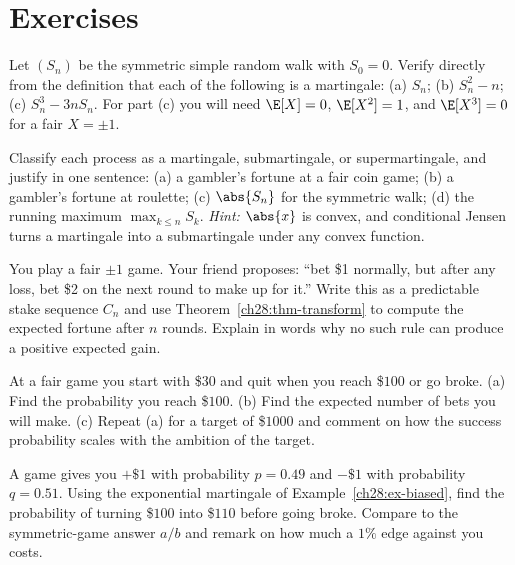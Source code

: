 \section{Exercises}
\label{ch28:exercises}

\begin{exercise}
\label{ch28:exer-warmup}
Let $(S_n)$ be the symmetric simple random walk with $S_0 = 0$. Verify directly from the definition
that each of the following is a martingale: (a) $S_n$; (b) $S_n^2 - n$; (c) $S_n^3 - 3n S_n$. For part
(c) you will need $\E[X] = 0$, $\E[X^2] = 1$, and $\E[X^3] = 0$ for a fair $X = \pm 1$.
\end{exercise}

\begin{exercise}
\label{ch28:exer-def}
Classify each process as a martingale, submartingale, or supermartingale, and justify in one sentence:
(a) a gambler's fortune at a fair coin game; (b) a gambler's fortune at roulette; (c) $\abs{S_n}$ for
the symmetric walk; (d) the running maximum $\max_{k\le n} S_k$. \emph{Hint:} $\abs{x}$ is convex, and
conditional Jensen turns a martingale into a submartingale under any convex function.
\end{exercise}

\begin{exercise}
\label{ch28:exer-predictable}
You play a fair $\pm 1$ game. Your friend proposes: ``bet \$1 normally, but after any loss, bet \$2 on
the next round to make up for it.'' Write this as a predictable stake sequence $C_n$ and use
Theorem~\ref{ch28:thm-transform} to compute the expected fortune after $n$ rounds. Explain in words why
no such rule can produce a positive expected gain.
\end{exercise}

\begin{exercise}
\label{ch28:exer-ruin}
At a fair game you start with \$$30$ and quit when you reach \$$100$ or go broke. (a) Find the
probability you reach \$$100$. (b) Find the expected number of bets you will make. (c) Repeat (a) for a
target of \$$1000$ and comment on how the success probability scales with the ambition of the target.
\end{exercise}

\begin{exercise}
\label{ch28:exer-biased}
A game gives you $+\$1$ with probability $p = 0.49$ and $-\$1$ with probability $q = 0.51$. Using the
exponential martingale of Example~\ref{ch28:ex-biased}, find the probability of turning \$$100$ into
\$$110$ before going broke. Compare to the symmetric-game answer $a/b$ and remark on how much a
$1\%$ edge against you costs.
\end{exercise}

